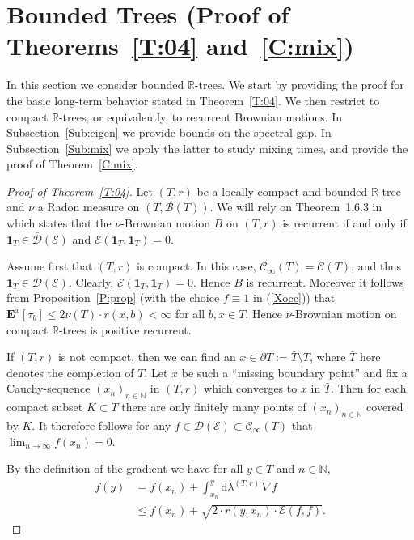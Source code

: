 \documentclass[11pt]{amsart}
\numberwithin{equation}{section}
\begin{document}
{\section{Bounded Trees (Proof of Theorems~\ref{T:04} and~\ref{C:mix})}
\label{S:compact}

In this section we consider bounded ${{\mathbb R}}$-trees. We start by providing the proof for the basic long-term behavior stated in Theorem~\ref{T:04}.
We then restrict to compact ${{\mathbb R}}$-trees, or equivalently, to recurrent Brownian motions.
In Subsection~\ref{Sub:eigen} we
provide bounds on the spectral gap. In
Subsection~\ref{Sub:mix} we apply the latter to study mixing times,
and provide the proof of Theorem~\ref{C:mix}.

\begin{proof}[Proof of Theorem~\ref{T:04}]  Let $(T,r)$ be a locally compact and bounded ${{\mathbb R}}$-tree and $\nu$ a Radon measure on $(T,{\mathcal B}(T))$. We will rely on Theorem~1.6.3 in \cite{FukushimaOshimaTakeda1994} which states that the $\nu$-Brownian motion $B$ on $(T,r)$
is recurrent if and only if $\mathbf{1}_T\in\bar{\mathcal D}({\mathcal E})$ and ${\mathcal E}(\mathbf{1}_T,\mathbf{1}_T)=0$. {\smallskip}

Assume first that $(T,r)$ is {{\it} compact}. In this case, ${\mathcal C}_\infty(T)={\mathcal C}(T)$, and thus $\mathbf{1}_T\in{\mathcal D}({\mathcal E})$. {Clearly}, ${\mathcal E}(\mathbf{1}_T,\mathbf{1}_T)=0$. Hence $B$ is recurrent. Moreover it follows from Proposition~\ref{P:prop}  (with the choice $f\equiv 1$ in (\ref{Xocc}))
that $\mathbf{E}^x[\tau_b]\le 2\nu(T)\cdot r(x,b)<\infty$ for all $b,x\in T$. Hence $\nu$-Brownian motion on compact ${{\mathbb R}}$-trees is positive recurrent.
{\smallskip}

If $(T,r)$ is {{\it} not compact}, then we can find an $x\in\partial T:=\bar{T}\setminus T$, where $\bar{T}$ here denotes the completion of $T$. Let $x$ be such a ``missing boundary point'' and fix a
Cauchy-sequence $(x_n)_{n\in{{\mathbb N}}}$ in $(T,r)$ which converges to $x$ in $\bar{T}$. Then for each compact subset $K\subset T$ there are only finitely many points of $(x_n)_{n\in{{\mathbb N}}}$ covered by $K$. It therefore follows for any
$f\in{\mathcal D}({\mathcal E})\subset{\mathcal C}_{\infty}(T)$ that $\lim_{n\to\infty}f(x_n)=0$.

By the definition of the gradient we have for all $y\in T$ and $n\in{{\mathbb N}}$,
\begin{equation}
\label{e:eqq}
\begin{aligned}
   f(y)
 &=
   f(x_n)+\int_{x_n}^y\mathrm{d}\lambda^{(T,r)}\,\nabla f
  \\
 &\le
   f(x_n)+\sqrt{2\cdot r(y,x_n)\cdot{\mathcal E}(f,f)}.
\end{aligned}
\end{equation}


\end{proof}}
\end{document}
